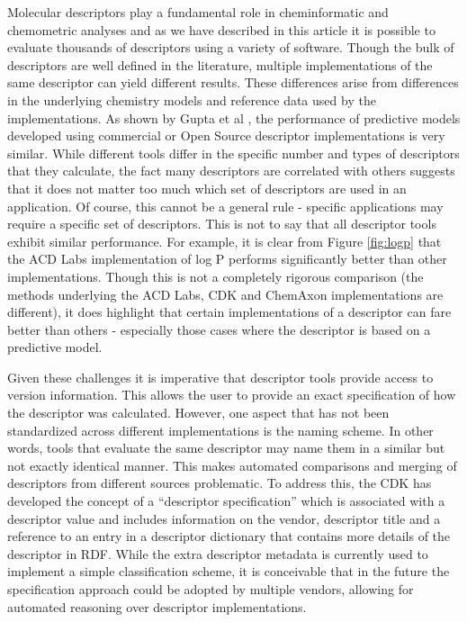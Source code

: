 \documentclass[letterpaper, 12pt]{article}
\begin{document}
Molecular descriptors play a fundamental role in cheminformatic and
chemometric analyses and as we have described in this article it is
possible to evaluate thousands of descriptors using a variety of
software. Though the bulk of descriptors are well defined in the
literature, multiple implementations of the same descriptor can yield
different results. These differences arise from differences in the
underlying chemistry models and reference data used by the
implementations. As shown by Gupta et al \cite{Gupta:2010uq},
the performance of predictive models developed using commercial or
Open Source descriptor implementations is very similar. While
different tools differ in the specific number and types of descriptors
that they calculate, the fact many descriptors are correlated with
others suggests that it does not matter too much which set of
descriptors are used in an application. Of course, this cannot be a
general rule - specific applications may require a specific set of
descriptors. This is not to say that all descriptor tools exhibit
similar performance. For example, it is clear from Figure \ref{fig:logp}
that the ACD Labs implementation of log P performs significantly
better than other implementations. Though this is not a completely
rigorous comparison (the methods underlying the ACD Labs, CDK and
ChemAxon implementations are different), it does highlight that
certain implementations of a descriptor can fare better than others -
especially those cases where the descriptor is based on a predictive
model. 

Given these challenges it is imperative that descriptor tools provide
access to version information. This allows the user to provide an
exact specification of how the descriptor was calculated. However, one
aspect that has not been standardized across different implementations
is the naming scheme. In other words, tools that evaluate the same
descriptor may name them in a similar but not exactly identical
manner. This makes automated comparisons and merging of descriptors
from different sources problematic. To address this, the CDK has developed
the concept of a ``descriptor specification'' which is associated with
a descriptor value and includes information on the vendor, descriptor
title and a reference to an entry in a descriptor dictionary that
contains more details of the descriptor in RDF. While the extra
descriptor metadata is currently used to implement a simple
classification scheme, it is conceivable that in the future the
specification approach could be adopted by multiple vendors, allowing
for automated reasoning over descriptor implementations.
\end{document}
